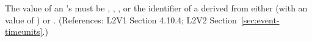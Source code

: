 The value of an \Event's  must be ,
, , or the identifier of a
\UnitDefinition derived from either  (with an
 value of ) or .
(References: L2V1 Section 4.10.4; L2V2 Section~\ref{sec:event-timeunits}.)
